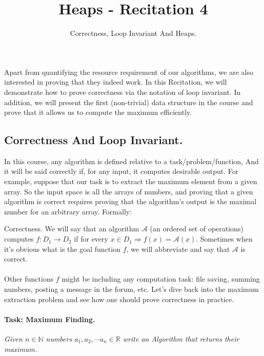 \title{Heaps - Recitation 4} 
\author{Correctness, Loop Invariant And Heaps.}


  Apart from quantifying the resource requirement of our algorithms, we are also interested in proving that they indeed work. In this Recitation, we will demonstrate how to prove correctness via the notation of loop invariant. In addition, we will present the first (non-trivial) data structure in the course and prove that it allows us to compute the maximum efficiently.



\subsection*{Correctness And Loop Invariant.}
In this course, any algorithm is defined relative to a task/problem/function, And it will be said correctly if, for any input, it computes desirable output. For example, suppose that our task is to extract the maximum element from a given array. 
So the input space is all the arrays of numbers, and proving that a given algorithm is correct requires proving that the algorithm's output is the maximal number for an arbitrary array. Formally:  
\begin{defbox}{Correctness.}
We will say that an algorithm \( \mathcal{A}\) (an ordered set of operations) computes \( f:D_1 \rightarrow D_2 \) if for every \(x \in D_1 \Rightarrow f(x) = \mathcal{A}(x)\). Sometimes when it's obvious what is the goal function \(f\), we will abbreviate and say that \( \mathcal{A}\) is correct.       
\end{defbox}
\paragraph{}
Other functions \(f\) might be including any computation task: file saving, summing numbers, posting a message in the forum, etc. Let's dive back into the maximum extraction problem and see how one should prove correctness in practice.     
\paragraph{Task: Maximum Finding.} \textit{Given $n\in \mathbb{N}$ numbers $a_1, a_2, \cdots a_n \in \mathbb{R}$ write an Algorithm that returns their maximum.} 

